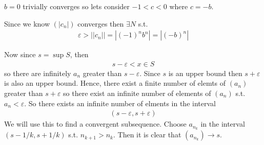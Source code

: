$b=0$ trivially converges so lets consider $-1<c<0$ where $c=-b$.

Since we know $(|c_n|)$ converges then $\exists N$ s.t. 
\begin{align*}
    \varepsilon > ||c_n|| = |(-1)^n b^n| = |(-b)^n|
\end{align*}

Now since $s=\sup S$, then 
\begin{align*}
    s - \varepsilon < x \in S
\end{align*}
so there are infinitely $a_n$ greater than $s - \varepsilon$.
Since $s$ is an upper bound then $s+\varepsilon$ is also an upper bound. Hence,
there exist a finite number of elemts of $(a_n)$ greater than $s+\varepsilon$
so there exist an infinite number of elements of $(a_n)$ s.t. $a_n < \varepsilon$.
So there exists an infinite number of elments in the interval 
\begin{align}
    (s-\varepsilon, s+\varepsilon)
\end{align}
We will use this to find a convergent subsequence. 
Choose $a_{n_k}$ in the interval $(s - 1/k,s+1/k)$ s.t. $n_{k+1}>n_k$.
Then it is clear that $(a_{n_k}) \rightarrow s$.